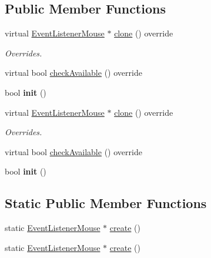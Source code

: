 \subsection*{Public Member Functions}
\begin{DoxyCompactItemize}
\item 
\mbox{\label{classEventListenerMouse_a7696b08cd79fcc6ef6bc165c8e0bbf81}} 
virtual \hyperlink{classEventListenerMouse}{Event\+Listener\+Mouse} $\ast$ \hyperlink{classEventListenerMouse_a7696b08cd79fcc6ef6bc165c8e0bbf81}{clone} () override
\begin{DoxyCompactList}\small\item\em Overrides. \end{DoxyCompactList}\item 
virtual bool \hyperlink{classEventListenerMouse_ac60e3ef56883beeb2f8660c921421e63}{check\+Available} () override
\item 
\mbox{\label{classEventListenerMouse_a2953766e9d48657c5a47156933c505d1}} 
bool {\bfseries init} ()
\item 
\mbox{\label{classEventListenerMouse_ae4c910ce9d885e1f1efc7cd380bee94a}} 
virtual \hyperlink{classEventListenerMouse}{Event\+Listener\+Mouse} $\ast$ \hyperlink{classEventListenerMouse_ae4c910ce9d885e1f1efc7cd380bee94a}{clone} () override
\begin{DoxyCompactList}\small\item\em Overrides. \end{DoxyCompactList}\item 
virtual bool \hyperlink{classEventListenerMouse_acf0e2a02290738775a08c6032c741d38}{check\+Available} () override
\item 
\mbox{\label{classEventListenerMouse_a2953766e9d48657c5a47156933c505d1}} 
bool {\bfseries init} ()
\end{DoxyCompactItemize}
\subsection*{Static Public Member Functions}
\begin{DoxyCompactItemize}
\item 
static \hyperlink{classEventListenerMouse}{Event\+Listener\+Mouse} $\ast$ \hyperlink{classEventListenerMouse_ab30f113b7c3b6c4feaf3eb989e5755c9}{create} ()
\item 
static \hyperlink{classEventListenerMouse}{Event\+Listener\+Mouse} $\ast$ \hyperlink{classEventListenerMouse_a4c1fbbe54ebab508cf418cd5f42af6b4}{create} ()
\end{DoxyCompactItemize}
